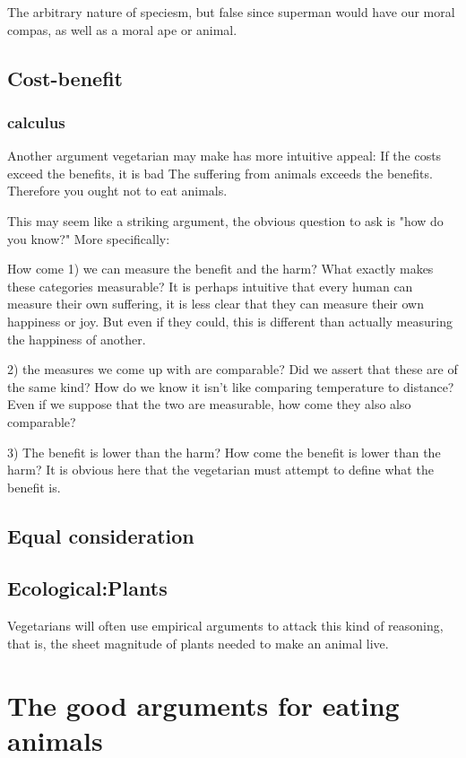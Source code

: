 \documentclass[12pt]{report}
\numberwithin{equation}{section}
\begin{document}
The arbitrary nature of speciesm, but false since superman would have our moral compas, as well as a moral ape or animal. 

\section{Cost-benefit}

\subsection{calculus}

Another argument vegetarian may make has more intuitive appeal:
If the costs exceed the benefits, it is bad
The suffering from animals exceeds the benefits.
Therefore you ought not to eat animals. 

This may seem like a striking argument, the obvious question to ask is "how do you know?" More specifically:

How come 1) we can measure the benefit and the harm? What exactly makes these categories measurable? It is perhaps intuitive that every human can measure their own suffering, it is less clear that they can measure their own happiness or joy. But even if they could, this is different than actually measuring the happiness of another. 

2) the measures we come up with are comparable? Did we assert that these are of the same kind? How do we know it isn't like comparing temperature to distance? Even if we suppose that the two are measurable, how come they also also comparable?  

3) The benefit is lower than the harm? How come the benefit is lower than the harm? It is obvious here that the vegetarian must attempt to define what the benefit is. 

\section{Equal consideration}

\section{Ecological:Plants}

Vegetarians will often use empirical arguments to attack this kind of reasoning, that is, the sheet magnitude of plants needed to make an animal live. 


\chapter{The good arguments for eating animals}
\end{document}

